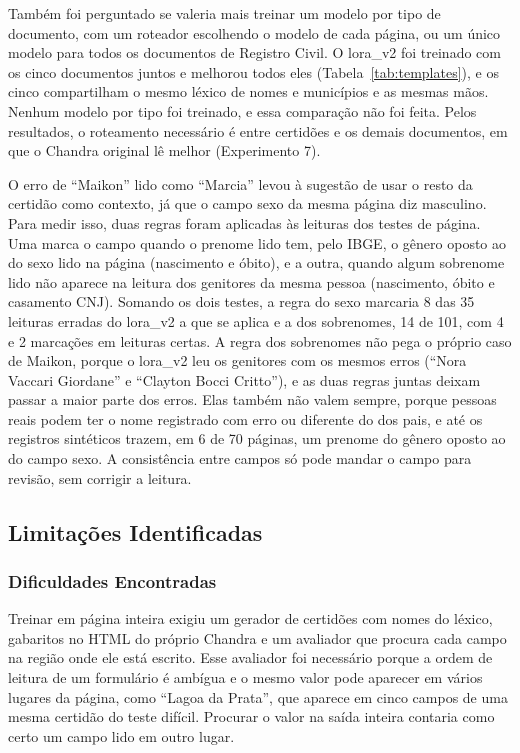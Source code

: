 Também foi perguntado se valeria mais treinar um modelo por tipo de documento, com um roteador escolhendo o modelo de cada página, ou um único modelo para todos os documentos de Registro Civil. O lora\_v2 foi treinado com os cinco documentos juntos e melhorou todos eles (Tabela~\ref{tab:templates}), e os cinco compartilham o mesmo léxico de nomes e municípios e as mesmas mãos. Nenhum modelo por tipo foi treinado, e essa comparação não foi feita. Pelos resultados, o roteamento necessário é entre certidões e os demais documentos, em que o Chandra original lê melhor (Experimento 7).

O erro de ``Maikon'' lido como ``Marcia'' levou à sugestão de usar o resto da certidão como contexto, já que o campo sexo da mesma página diz masculino. Para medir isso, duas regras foram aplicadas às leituras dos testes de página. Uma marca o campo quando o prenome lido tem, pelo IBGE, o gênero oposto ao do sexo lido na página (nascimento e óbito), e a outra, quando algum sobrenome lido não aparece na leitura dos genitores da mesma pessoa (nascimento, óbito e casamento CNJ). Somando os dois testes, a regra do sexo marcaria 8 das 35 leituras erradas do lora\_v2 a que se aplica e a dos sobrenomes, 14 de 101, com 4 e 2 marcações em leituras certas. A regra dos sobrenomes não pega o próprio caso de Maikon, porque o lora\_v2 leu os genitores com os mesmos erros (``Nora Vaccari Giordane'' e ``Clayton Bocci Critto''), e as duas regras juntas deixam passar a maior parte dos erros. Elas também não valem sempre, porque pessoas reais podem ter o nome registrado com erro ou diferente do dos pais, e até os registros sintéticos trazem, em 6 de 70 páginas, um prenome do gênero oposto ao do campo sexo. A consistência entre campos só pode mandar o campo para revisão, sem corrigir a leitura.

\subsection{Limitações Identificadas}

\subsubsection{Dificuldades Encontradas}
Treinar em página inteira exigiu um gerador de certidões com nomes do léxico, gabaritos no HTML do próprio Chandra e um avaliador que procura cada campo na região onde ele está escrito. Esse avaliador foi necessário porque a ordem de leitura de um formulário é ambígua e o mesmo valor pode aparecer em vários lugares da página, como ``Lagoa da Prata'', que aparece em cinco campos de uma mesma certidão do teste difícil. Procurar o valor na saída inteira contaria como certo um campo lido em outro lugar.

